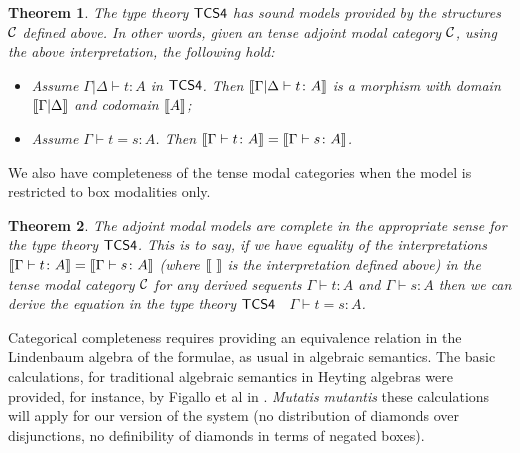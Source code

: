 \documentclass{article}
\def\sem#1{[\hspace{-0.05cm}[#1]\hspace{-0.05cm}]}
\newtheorem{theorem}{Theorem}
\begin{document}
\begin{theorem}
\label{thm:tcs4-csound}
The type theory $\sf{TCS4}$  has  \textit{sound} models provided by the structures $\cal C$ defined above.
In other words, given an tense adjoint modal category $\cal C$, using the above interpretation, the following hold:
\begin{itemize}
\item Assume $\Gamma|\Delta \vdash t : A$ in $\sf{TCS4}$. Then $\sem{\Gamma |
    \Delta \vdash t \colon A}$ is a morphism  with domain
  $\sem{\Gamma | \Delta}$ and codomain $\sem{A}$;
\item Assume $\Gamma \vdash t = s \colon A$. Then $\sem{\Gamma
  \vdash t \colon A} = \sem{\Gamma \vdash s \colon A}$.
\end{itemize}
\end{theorem}

We also have completeness of the tense modal categories when the model
is restricted to box modalities only.

\begin{theorem}
\label{thm:tcs4-completeness}
The adjoint modal models are \textit{complete} in the appropriate
sense for the type theory $\sf{TCS4}$. This is to say, if we have
equality of the interpretations $\sem{\Gamma \vdash t \colon A} =
\sem{\Gamma \vdash s \colon A}$ (where \mbox{$\sem{\ } $} is the
interpretation defined above) in the tense modal category $\cal C$ for
any derived sequents $\Gamma \vdash t \colon A$ and $\Gamma \vdash s
\colon A$ then we can derive the equation in the type theory
$\sf{TCS4}$ $\;$ $\Gamma \vdash t = s \colon A$.
\end{theorem}
Categorical completeness requires providing an equivalence relation in
the Lindenbaum algebra of the formulae, as usual in algebraic
semantics. The basic calculations, for traditional algebraic semantics
in Heyting algebras were provided, for instance, by Figallo et al in
\cite{figallo2014}. \textit{Mutatis mutantis} these calculations will
apply for our version of the system (no distribution of diamonds over
disjunctions, no definibility of diamonds in terms of negated boxes).
\end{document}
